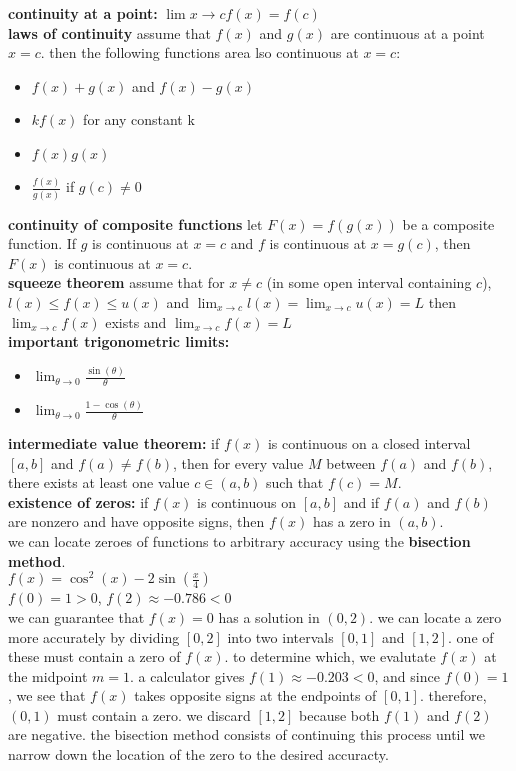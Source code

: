\documentclass{article}
\begin{document}
\textbf{continuity at a point:} $\lim{x \to c}f(x) = f(c)$\\

\textbf{laws of continuity} assume that $f(x)$ and $g(x)$ are continuous at a point $x = c$. then the following functions area lso continuous at $x = c$:
	\begin{itemize}
		\item $f(x) + g(x)$ and $f(x) - g(x)$
		\item $kf(x)$ for any constant k
		\item $f(x)g(x)$
		\item $\frac{f(x)}{g(x)}$ if $g(c) \neq 0$
	\end{itemize}

\textbf{continuity of composite functions} let $F(x) = f(g(x))$ be a composite function. If $g$ is continuous at $x = c$ and $f$ is continuous at $x = g(c)$, then $F(x)$ is continuous at $x = c$.\\

\textbf{squeeze theorem} assume that for $x \neq c$ (in some open interval containing $c$), $l(x) \leq f(x) \leq u(x)$ and $\lim_{x \to c}l(x) = \lim_{x \to c}u(x) = L$ then $\lim_{x \to c}f(x)$ exists and $\lim_{x \to c}f(x) = L$\\

\textbf{important trigonometric limits:}
	\begin{itemize}
		\item $\lim_{\theta \to 0}\frac{\sin(\theta)}{\theta}$
		\item $\lim_{\theta \to 0}\frac{1 - \cos(\theta)}{\theta}$
	\end{itemize}

\textbf{intermediate value theorem:} if $f(x)$ is continuous on a closed interval $[a, b]$ and $f(a) \neq f(b)$, then for every value $M$ between $f(a)$ and $f(b)$, there exists at least one value $c \in (a, b)$ such that $f(c) = M$.\\

\textbf{existence of zeros:} if $f(x)$ is continuous on $[a, b]$ and if $f(a)$ and $f(b)$ are nonzero and have opposite signs, then $f(x)$ has a zero in $(a, b)$.\\

we can locate zeroes of functions to arbitrary accuracy using the \textbf{bisection method}.\\
$f(x) = \cos^2(x) - 2\sin(\frac{x}{4})$\\
$f(0) = 1 > 0$, $f(2) \approx -0.786 < 0$\\
we can guarantee that $f(x) = 0$ has a solution in $(0, 2)$. we can locate a zero more accurately by dividing $[0, 2]$ into two intervals $[0, 1]$ and $[1, 2]$. one of these must contain a zero of $f(x)$. to determine which, we evalutate $f(x)$ at the midpoint $m = 1$. a calculator gives $f(1) \approx -0.203 < 0$, and since $f(0) = 1$, we see that $f(x)$ takes opposite signs at the endpoints of $[0, 1]$. therefore, $(0, 1)$ must contain a zero. we discard $[1, 2]$ because both $f(1)$ and $f(2)$ are negative. the bisection method consists of continuing this process until we narrow down the location of the zero to the desired accuracty.\\
\end{document}
